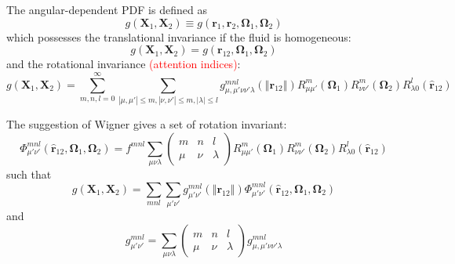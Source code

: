 The angular-dependent \acs{PDF} is defined as 
\begin{equation}
g(\mathbf{X}_{1},\mathbf{X}_{2})\equiv g(\mathbf{r}_{1},\mathbf{r}_{2},\mathbf{\Omega}_{1},\mathbf{\Omega}_{2})
\end{equation}
which possesses the translational invariance if the fluid is homogeneous:
\begin{equation}
g(\mathbf{X}_{1},\mathbf{X}_{2})=g(\mathbf{r}_{12},\mathbf{\Omega}_{1},\mathbf{\Omega}_{2})
\end{equation}
and the rotational invariance \textcolor{red}{(attention indices)}:
\begin{equation}
g(\mathbf{X}_{1},\mathbf{X}_{2})=\sum_{m,n,l=0}^{\infty}\sum_{\left|\mu,\mu'\right|\leq m,\left|\nu,\nu'\right|\leq m,\left|\lambda\right|\leq l}g_{\mu,\mu'\nu\nu'\lambda}^{mnl}(\left\Vert \mathbf{r}_{12}\right\Vert )R_{\mu\mu'}^{m}(\mathbf{\Omega}_{1})R_{\nu\nu'}^{m}(\mathbf{\Omega}_{2})R_{\lambda0}^{l}(\hat{\mathbf{r}}_{12})
\end{equation}

The suggestion of Wigner gives a set of rotation invariant:
\begin{equation}
\Phi_{\mu'\nu'}^{mnl}(\hat{\mathbf{r}}_{12},\mathbf{\Omega}_{1},\mathbf{\Omega}_{2})=f^{mnl}\sum_{\mu\nu\lambda}\left(\begin{array}{ccc}
m & n & l\\
\mu & \nu & \lambda
\end{array}\right)R_{\mu\mu'}^{m}(\mathbf{\Omega}_{1})R_{\nu\nu'}^{m}(\mathbf{\Omega}_{2})R_{\lambda0}^{l}(\hat{\mathbf{r}}_{12})
\end{equation}
such that
\begin{equation}
g(\mathbf{X}_{1},\mathbf{X}_{2})=\sum_{mnl}\sum_{\mu'\nu'}g_{\mu'\nu'}^{mnl}(\left\Vert \mathbf{r}_{12}\right\Vert )\Phi_{\mu'\nu'}^{mnl}(\hat{\mathbf{r}}_{12},\mathbf{\Omega}_{1},\mathbf{\Omega}_{2})
\end{equation}
and
\begin{equation}
g_{\mu'\nu'}^{mnl}=\sum_{\mu\nu\lambda}\left(\begin{array}{ccc}
m & n & l\\
\mu & \nu & \lambda
\end{array}\right)g_{\mu,\mu'\nu\nu'\lambda}^{mnl}
\end{equation}

